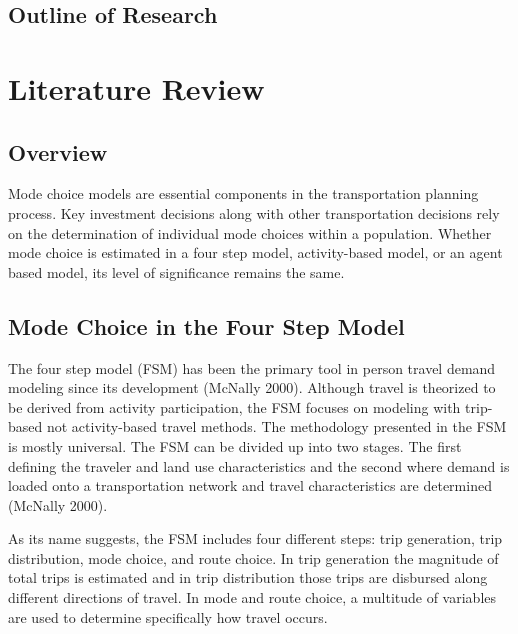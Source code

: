 \documentclass[12pt, oneside, openright]{byuthesis}
\begin{document}
\hypertarget{outline-of-research}{%
\section{Outline of Research}\label{outline-of-research}}

\hypertarget{literature-review}{%
\chapter{Literature Review}\label{literature-review}}

\hypertarget{overview}{%
\section{Overview}\label{overview}}

Mode choice models are essential components in the transportation planning process. Key investment decisions along with other transportation decisions rely on the determination of individual mode choices within a population. Whether mode choice is estimated in a four step model, activity-based model, or an agent based model, its level of significance remains the same.

\hypertarget{lit1}{%
\section{Mode Choice in the Four Step Model}\label{lit1}}

The four step model (FSM) has been the primary tool in person travel demand modeling since its development (McNally 2000). Although travel is theorized to be derived from activity participation, the FSM focuses on modeling with trip-based not activity-based travel methods. The methodology presented in the FSM is mostly universal. The FSM can be divided up into two stages. The first defining the traveler and land use characteristics and the second where demand is loaded onto a transportation network and travel characteristics are determined (McNally 2000).

As its name suggests, the FSM includes four different steps: trip generation, trip distribution, mode choice, and route choice. In trip generation the magnitude of total trips is estimated and in trip distribution those trips are disbursed along different directions of travel. In mode and route choice, a multitude of variables are used to determine specifically how travel occurs.
\end{document}
